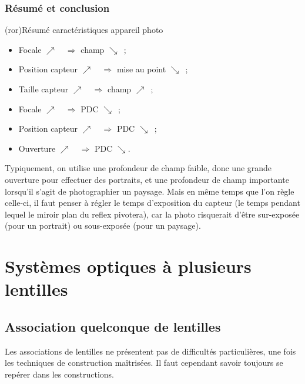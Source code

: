 \documentclass[../../main/main.tex]{subfiles}
\begin{document}
\subsubsection{Résumé et conclusion}
\begin{tcb}[label=ror:app_phot](ror){Résumé caractéristiques appareil photo}
	\begin{minipage}{0.50\linewidth}
		\begin{itemize}[label=$\diamond$, leftmargin=10pt]
			\item Focale $\nearrow\quad\Rightarrow$ champ $\searrow$~;
			\item Position capteur $\nearrow\quad\Rightarrow$ mise au point
			      $\searrow$~;
			\item Taille capteur $\nearrow\quad\Rightarrow$ champ $\nearrow$~;
		\end{itemize}
	\end{minipage}
	\begin{minipage}{0.50\linewidth}
		\begin{itemize}[label=$\diamond$, leftmargin=10pt]
			\item Focale $\nearrow\quad\Rightarrow$ PDC $\searrow$~;
			\item Position capteur $\nearrow\quad\Rightarrow$ PDC $\searrow$~;
			\item Ouverture $\nearrow\quad\Rightarrow$ PDC $\searrow$.
		\end{itemize}
	\end{minipage}
\end{tcb}

Typiquement, on utilise une profondeur de champ faible, donc une grande
ouverture pour effectuer des portraits, et une profondeur de champ importante
lorsqu'il s'agit de photographier un paysage.\newline
Mais en même temps que l'on règle celle-ci, il faut penser à régler le temps
d'exposition du capteur (le temps pendant lequel le miroir plan du reflex
pivotera), car la photo risquerait d'être sur-exposée (pour un portrait) ou
sous-exposée (pour un paysage).

\section{Systèmes optiques à plusieurs lentilles}

\subsection{Association quelconque de lentilles}
Les associations de lentilles ne présentent pas de difficultés particulières,
une fois les techniques de construction maîtrisées. Il faut cependant savoir
toujours se repérer dans les constructions.
\end{document}
